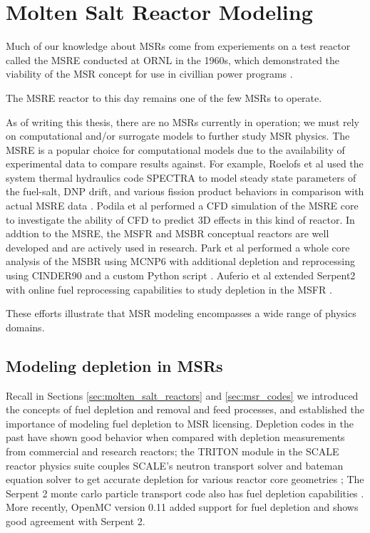 \chapter{Molten Salt Reactor Modeling}%
\label{cha:msr_modeling}
Much of our knowledge about \Gls{MSR}s come from experiements on a test reactor called the \Gls{MSRE} conducted at \Gls{ORNL} in the 1960s, which demonstrated the viability of the \Gls{MSR} concept for use in civillian power programs \cite{haubenreich_experience_1970} \cite{rosenthal_molten-salt_1970}.

The \Gls{MSRE} reactor to this day remains one of the few \Gls{MSR}s to operate.

As of writing this thesis, there are no \Gls{MSR}s currently in operation; we must rely on computational and/or surrogate models to further study \Gls{MSR} physics. The \Gls{MSRE} is a popular choice for computational models due to the availability of experimental data to compare results against. For example, Roelofs et al used the system thermal hydraulics code SPECTRA to model steady state parameters of the fuel-salt, \Gls{DNP} drift, and various fission product behaviors
in comparison with actual MSRE data \cite{roelofs_molten_2021}.  Podila et al performed a \Gls{CFD} simulation of the \Gls{MSRE} core to investigate the ability of \Gls{CFD} to predict 3D effects in this kind of reactor\cite{podila_cfd_2019}. 
In addtion to the \Gls{MSRE}, the \Gls{MSFR}\cite{merle-lucotte_launching_2011} and \Gls{MSBR}\cite{robertson_conceptual_1971} conceptual reactors are well developed and are actively used in research. Park et al performed a whole core analysis of the \Gls{MSBR} using MCNP6 with additional depletion and reprocessing using CINDER90 and a custom Python script \cite{park_whole_2015}. Auferio et al extended Serpent2 with online fuel reprocessing capabilities to study depletion in the \Gls{MSFR} \cite{auferio_extended_2013}.

These efforts illustrate that \Gls{MSR} modeling encompasses a wide range of physics domains.

\section{Modeling depletion in \Gls{MSR}s}
Recall in Sections
\ref{sec:molten_salt_reactors} and \ref{sec:msr_codes} we introduced the concepts of fuel depletion and removal and feed processes, and established the importance of modeling fuel depletion to \Gls{MSR} licensing. Depletion codes in the past have shown good behavior when compared with depletion measurements from commercial and research reactors; the TRITON module in the SCALE reactor physics suite couples SCALE's neutron transport solver and bateman equation
solver to get
accurate depletion for various reactor core geometries \cite{dehart_reactor_2011};
The Serpent 2 monte carlo particle transport code also has fuel depletion capabilities \cite{leppanen_burnup_2009}. More recently, OpenMC version 0.11 added support for fuel depletion and shows good agreement with Serpent 2\cite{romano_depletion_2021}.

